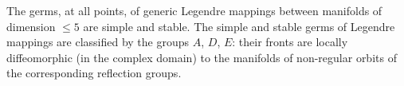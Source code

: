 The germs, at all points, of generic Legendre mappings between manifolds of dimension $\le 5$ are simple and stable. The simple and stable germs of Legendre mappings are classified by the groups $A$, $D$, $E$: their fronts are locally diffeomorphic (in the complex domain) to the manifolds of non-regular orbits of the corresponding reflection groups.
